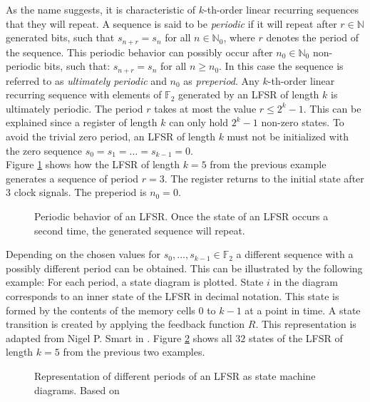 As the name suggests, it is characteristic of $k$-th-order linear recurring sequences that they will repeat. A sequence is said to be \textit{periodic} if it will repeat after $r\in\mathbb{N}$ generated bits, such that $s_{n+r}=s_n$ for all $n\in\mathbb{N}_0$, where $r$ denotes the period of the sequence. This periodic behavior can possibly occur after $n_0\in\mathbb{N}_0$ non-periodic bits, such that: $s_{n+r}=s_n$ for all $n\ge{n_{0}}$. In this case the sequence is referred to as \textit{ultimately periodic} and $n_0$ as \textit{preperiod}. Any $k$-th-order linear recurring sequence with elements of $\mathbb{F}_2$ generated by an LFSR of length $k$ is ultimately periodic. The period $r$ takes at most the value $r\le2^{k}-1$. This can be explained since a register of length $k$ can only hold $2^{k}-1$ non-zero states. To avoid the trivial zero period, an LFSR of length $k$ must not be initialized with the zero sequence $s_0=s_1=\ldots=s_{k-1}=0$. \cite[p. 189]{Lidl.1986} \\

Figure \ref{fig:Figure_5} shows how the LFSR of length $k=5$ from the previous example generates a sequence of period $r=3$. The register returns to the initial state after $3$ clock signals. The preperiod is $n_0=0$.

\begin{figure}[h]
	\centering
	
	\caption{Periodic behavior of an LFSR. Once the state of an LFSR occurs a second time, the generated sequence will repeat.}
	\label{fig:Figure_5}
\end{figure}

Depending on the chosen values for $s_0,\ldots,s_{k-1}\in \mathbb{F}_2$ a different sequence with a possibly different period can be obtained. This can be illustrated by the following example: For each period, a state diagram is plotted. State $i$ in the diagram corresponds to an inner state of the LFSR in decimal notation. This state is formed by the contents of the memory cells $0$ to $k-1$ at a point in time. A state transition is created by applying the feedback function $R$. This representation is adapted from Nigel P. Smart in \cite[pp. 230]{Smart.2016}. Figure \ref{fig:Figure_6} shows all $32$ states of the LFSR of length $k=5$ from the previous two examples. 

\begin{figure}[h]
	\centering
	
	\caption{Representation of different periods of an LFSR as state machine diagrams. Based on \cite[pp. 230-232]{Smart.2016}}
	\label{fig:Figure_6}
\end{figure} 

